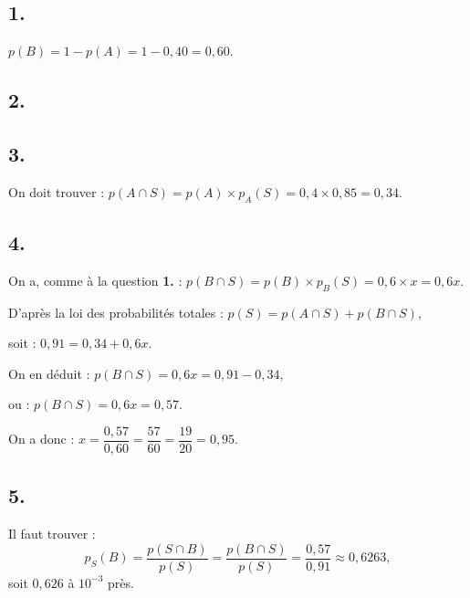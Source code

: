 \subsection*{1.}

\(p(B) = 1 - p(A) = 1 - 0{,}40 = 0{,}60\).

\subsection*{2.}

\begin{center}
\end{center}

\subsection*{3.}

On doit trouver : \(p(A \cap S) = p(A) \times p_A(S) = 0{,}4 \times 0{,}85 = 0{,}34\).

\subsection*{4.}

On a, comme à la question \textbf{1.} : \(p(B \cap S) = p(B) \times p_B(S) = 0{,}6 \times x = 0{,}6x\).

D'après la loi des probabilités totales : \(p(S) = p(A \cap S) + p(B \cap S)\),

soit : \(0{,}91 = 0{,}34 + 0{,}6x\).

On en déduit : \(p(B \cap S) = 0{,}6x = 0{,}91 - 0{,}34\),

ou : \(p(B \cap S) = 0{,}6x = 0{,}57\).

On a donc : \(x = \dfrac{0{,}57}{0{,}60} = \dfrac{57}{60} = \dfrac{19}{20} = 0{,}95\).

\subsection*{5.}

Il faut trouver :
\[
p_S(B) = \dfrac{p(S \cap B)}{p(S)} = \dfrac{p(B \cap S)}{p(S)} = \dfrac{0{,}57}{0{},91} \approx 0{,}6263,
\]
soit \(0{,}626\) à \(10^{-3}\) près.
